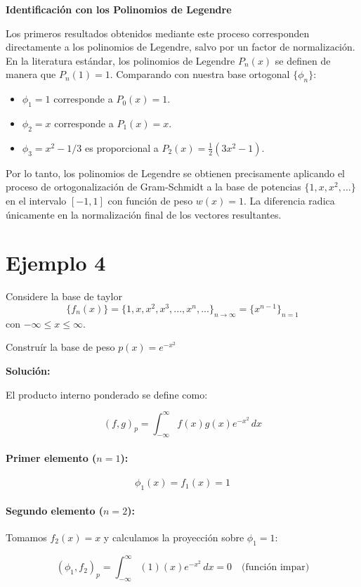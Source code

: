 \documentclass[a4paper]{article}
\begin{document}
\textbf{Identificación con los Polinomios de Legendre}

Los primeros resultados obtenidos mediante este proceso corresponden directamente a los polinomios de Legendre, salvo por un factor de normalización. En la literatura estándar, los polinomios de Legendre $P_n(x)$ se definen de manera que $P_n(1) = 1$. Comparando con nuestra base ortogonal $\{\phi_n\}$:

\begin{itemize}
    \item $\phi_1 = 1$ corresponde a $P_0(x) = 1$.
    \item $\phi_2 = x$ corresponde a $P_1(x) = x$.
    \item $\phi_3 = x^2 - 1/3$ es proporcional a $P_2(x) = \frac{1}{2}(3x^2 - 1)$.
\end{itemize}

Por lo tanto, los polinomios de Legendre se obtienen precisamente aplicando el proceso de ortogonalización de Gram-Schmidt a la base de potencias $\{1, x, x^2, \dots\}$ en el intervalo $[-1, 1]$ con función de peso $w(x) = 1$. La diferencia radica únicamente en la normalización final de los vectores resultantes.

\section{Ejemplo 4}

Considere la base de taylor $$\{f_n(x)\} = \{1, x, x^2, x^3,..., x^n,...\}_{n\to\infty} = \{x^{n-1}\}_{n=1}$$ con $-\infty\leq x\leq \infty$.

Construír la base de peso $p(x)=e^{-x^2}$

\textbf{Solución:}

El producto interno ponderado se define como:

$$(f, g)_p = \int_{-\infty}^{\infty} f(x) g(x) e^{-x^2} \, dx$$

\paragraph{Primer elemento ($n=1$):}
$$\phi_1(x) = f_1(x) = 1$$

\paragraph{Segundo elemento ($n=2$):}
Tomamos $f_2(x) = x$ y calculamos la proyección sobre $\phi_1 = 1$:

$$(\phi_1, f_2)_p = \int_{-\infty}^{\infty} (1)(x) e^{-x^2} \, dx = 0 \quad \text{(función impar)}$$
\end{document}
